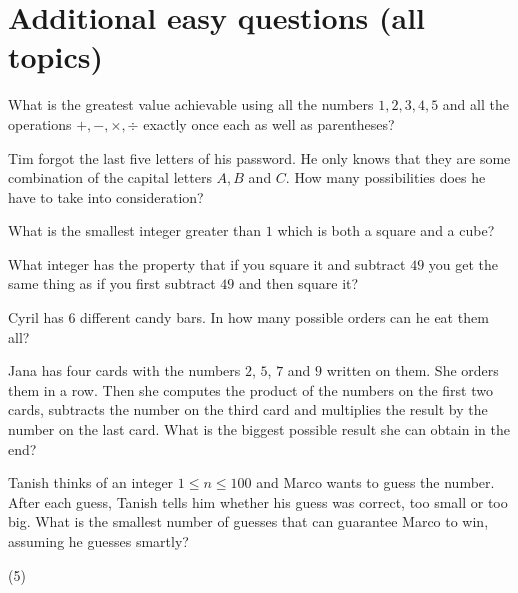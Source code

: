 \documentclass{article}
\begin{document}
\newpage
\section{Additional easy questions (all topics)}

\begin{problem}
What is the greatest value achievable using all the numbers $1,2,3,4,5$ and all the operations $+,-,\times,\div$ exactly once each as well as parentheses?
\end{problem}

\begin{problem}
Tim forgot the last five letters of his password. He only knows that they are some combination of the capital letters $A, B$ and $C$. How many possibilities does he have to take into consideration?
\end{problem}

\begin{problem}
What is the smallest integer greater than $1$ which is both a square and a cube?
\end{problem}

\begin{problem}
What integer has the property that if you square it and subtract $49$ you get the same thing as if you first subtract $49$ and then square it?
\end{problem}

\begin{problem}
Cyril has $6$ different candy bars. In how many possible orders can he eat them all?
\end{problem}

\begin{problem}
Jana has four cards with the numbers $2$, $5$, $7$ and $9$ written on them. She orders them in a row. Then she computes the product of the numbers on the first two cards, subtracts the number on the  third card and multiplies the result by the number on the last card. What is the biggest possible result she can obtain in the end?
\end{problem}

\begin{problem}
Tanish thinks of an integer $1\leq n \leq 100$ and Marco wants to guess the number. After each guess, Tanish tells him whether his guess was correct, too small or too big. What is the smallest number of guesses that can guarantee Marco to win, assuming he guesses smartly?
\begin{tasks} (5)
\end{tasks}
\end{problem}
\end{document}
